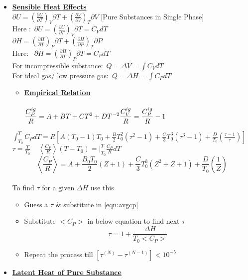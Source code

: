 \documentclass[12pt]{article}
\begin{document}
\begin{itemize}
\begin{tikzpicture}[x=0.75pt,y=0.75pt,yscale=-1,xscale=1]
\end{tikzpicture}\\
	\item \textbf{\underline{Sensible Heat Effects}}\\
	$\displaystyle \partial U = \left(\frac{\partial U}{\partial T}\right)_V\partial T+\left(\frac{\partial V}{\partial V}\right)_T \partial V$ [Pure Substances in Single Phase]\\
	Here :\ $\displaystyle \partial U = \left(\frac{\partial U}{\partial T}\right)_V\partial T=C_VdT$ \\
	$\displaystyle \partial H = \left(\frac{\partial H}{\partial T}\right)_P\partial T+\left(\frac{\partial H}{\partial P}\right)_T \partial P$\\
	Here: \ $\displaystyle \partial H = \left(\frac{\partial H}{\partial T}\right)_P\partial T=C_PdT$ \\
	For incompressible substance:\ $Q=\Delta V = \int C_V dT$\\
	For ideal gas/ low pressure gas:\ $Q=\Delta H = \int C_PdT$\\
	\begin{itemize}
		\item \textbf{\underline{Empirical Relation}}\\
		\\
		$\displaystyle \frac{C_P^{ig}}{R}=A+BT+CT^2+DT^{-2}\\ \\
		\frac{C_V^{ig}}{R}=\frac{C_P^{ig}}{R}-1$
	\end{itemize}
	$\displaystyle \int_{T_0}^TC_PdT=R\left[A(T_0-1)T_0+\frac{B}{2}T_0^2(\tau^2-1)+\frac{C}{3}T_0^3(\tau^3-1)+\frac{D}{T_0}\left(\frac{\tau-1}{\tau}\right)\right]$\\
	$\displaystyle \tau=\frac{T}{T_0} \ \ \ \ \ \left<\frac{C_P}{R}\right>(T-T_0)=|_{T_0}^{T}\frac{C_P}{R}dT$\\
	\[\displaystyle \left< \frac{C_P}{R}\right> = A+\frac{B_0T_0}{2}(Z+1)+\frac{C}{3}T_0^3(Z^2+Z+1)+\frac{D}{T_0}\left(\frac{1}{Z}\right) \label{eqn:avgcp} \tag{1}\]\\
	To find $\tau$ for a given $\Delta H$ use this
	\begin{itemize}
		\item Guess a $\tau$ \& substitute in \eqref{eqn:avgcp}
		\item Substitute $<C_P>$ in below equation to find next $\tau$
		\[\tau = 1+\frac{\Delta H}{T_0<C_P>}\]
		\item Repeat the process till $ [ \tau^{(N)}-\tau^{(N-1)}] < 10^{-5}$
	\end{itemize}
	\item \textbf{\underline{Latent Heat of Pure Substance}}
	


\end{itemize}
\end{document}
